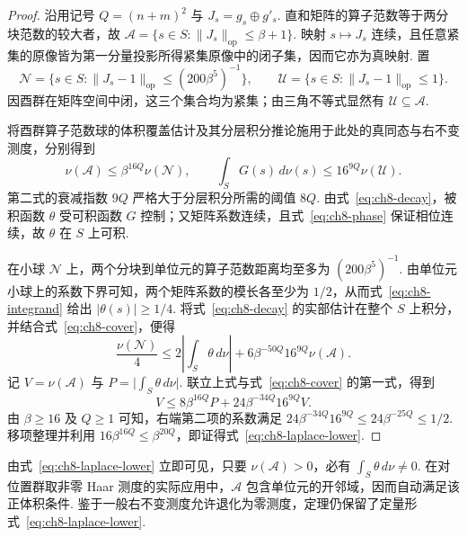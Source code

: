 \begin{proof}
沿用记号 $Q=(n+m)^2$ 与 $J_s=g_s\oplus g'_s$. 直和矩阵的算子范数等于两分块范数的较大者，故 $\mathcal A=\{s\in S:\|J_s\|_{\mathrm{op}}\le\beta+1\}$. 映射 $s\mapsto J_s$ 连续，且任意紧集的原像皆为第一分量投影所得紧集原像中的闭子集，因而它亦为真映射. 置
\[
 \mathcal N=\bigl\{s\in S:\|J_s-1\|_{\mathrm{op}}\le(200\beta^5)^{-1}\bigr\},
 \qquad
 \mathcal U=\bigl\{s\in S:\|J_s-1\|_{\mathrm{op}}\le1\bigr\}.
\]
因酉群在矩阵空间中闭，这三个集合均为紧集；由三角不等式显然有 $\mathcal U\subseteq\mathcal A$.

将酉群算子范数球的体积覆盖估计及其分层积分推论施用于此处的真同态与右不变测度，分别得到
\begin{equation}
\label{eq:ch8-cover}
 \nu(\mathcal A)\le\beta^{16Q}\nu(\mathcal N),\qquad
 \int_S G(s)\,d\nu(s)\le16^{9Q}\nu(\mathcal U).
\end{equation}
第二式的衰减指数 $9Q$ 严格大于分层积分所需的阈值 $8Q$. 由式~\eqref{eq:ch8-decay}，被积函数 $\theta$ 受可积函数 $G$ 控制；又矩阵系数连续，且式~\eqref{eq:ch8-phase} 保证相位连续，故 $\theta$ 在 $S$ 上可积.

在小球 $\mathcal N$ 上，两个分块到单位元的算子范数距离均至多为 $(200\beta^5)^{-1}$. 由单位元小球上的系数下界可知，两个矩阵系数的模长各至少为 $1/2$，从而式~\eqref{eq:ch8-integrand} 给出 $|\theta(s)|\ge1/4$. 将式~\eqref{eq:ch8-decay} 的实部估计在整个 $S$ 上积分，并结合式~\eqref{eq:ch8-cover}，便得
\[
 \frac{\nu(\mathcal N)}4
 \le 2\left|\int_S\theta\,d\nu\right|
     +6\beta^{-50Q}16^{9Q}\nu(\mathcal A).
\]
记 $V=\nu(\mathcal A)$ 与 $P=\bigl|\int_S\theta\,d\nu\bigr|$. 联立上式与式~\eqref{eq:ch8-cover} 的第一式，得到
\[
 V\le 8\beta^{16Q}P
    +24\beta^{-34Q}16^{9Q}V.
\]
由 $\beta\ge16$ 及 $Q\ge1$ 可知，右端第二项的系数满足 $24\beta^{-34Q}16^{9Q}\le 24\beta^{-25Q}\le 1/2$. 移项整理并利用 $16\beta^{16Q}\le\beta^{20Q}$，即证得式~\eqref{eq:ch8-laplace-lower}.
\end{proof}

\begin{remark}
由式~\eqref{eq:ch8-laplace-lower} 立即可见，只要 $\nu(\mathcal A)>0$，必有 $\int_S\theta\,d\nu\ne0$. 在对位置群取非零 Haar 测度的实际应用中，$\mathcal A$ 包含单位元的开邻域，因而自动满足该正体积条件. 鉴于一般右不变测度允许退化为零测度，定理仍保留了定量形式~\eqref{eq:ch8-laplace-lower}.
\end{remark}

